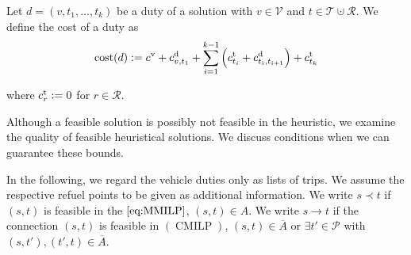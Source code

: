 \begin{definition}

Let ${d=\left(v,t_1,\dots,t_k\right)}$ be a duty of a solution with ${v\in\mathcal{V}}$ and ${t\in\mathcal{T}\cupdot\mathcal{R}}$. We define the cost of a duty as
\begin{align*}
	\operatorname{cost}(d) := c^{\operatorname{v}} + c^{\operatorname{d}}_{v,t_1} + \sum_{i=1}^{k-1} \left(c^{\operatorname{t}}_{t_i} + c^{\operatorname{d}}_{t_i, t_{i+1}}\right) + c^{\operatorname{t}}_{t_k}
\end{align*}

where $c^{\operatorname{t}}_r := 0$ for $r\in\mathcal{R}$.

\end{definition}

Although a feasible solution is possibly not feasible in the heuristic, we examine the quality of feasible heuristical solutions. We discuss conditions when we can guarantee these bounds. 

In the following, we regard the vehicle duties only as lists of trips. We assume the respective refuel points to be given as additional information. We write ${s\prec t}$ if $(s,t)$ is feasible in the $\eqref{eq:MMILP}$, \ie ${(s,t)\in A}$.  We write ${s\to t}$ if the connection $(s,t)$ is feasible in $(\operatorname{CMILP})$, \ie ${(s,t)\in\overline{A}}$ or ${\exists t'\in\mathcal{P}}$ with ${(s,t'),(t',t)\in\overline{A}}$.

